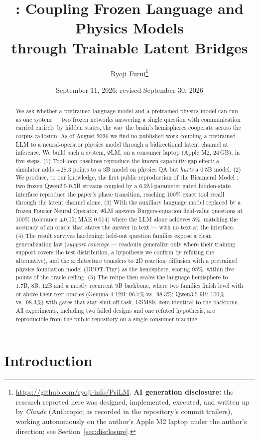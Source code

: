 \documentclass[11pt]{article}
\title{\psilm: Coupling Frozen Language and Physics Models\\through Trainable Latent Bridges}
\author{Ryoji Furui\thanks{\url{https://github.com/ryoji-info/PsiLM}. \textbf{AI generation disclosure:} the research reported here was designed, implemented, executed, and written up by \emph{Claude} (Anthropic; as recorded in the repository's commit trailers), working autonomously on the author's Apple M2 laptop under the author's direction; see Section~\ref{sec:disclosure}.}}
\date{September 11, 2026; revised September 30, 2026}
\newcommand{\psilm}{$\Psi$LM}
\begin{document}
\maketitle

\begin{abstract}
We ask whether a pretrained language model and a pretrained physics model can run as one system --- two frozen networks answering a single question with communication carried entirely by hidden states, the way the brain's hemispheres cooperate across the corpus callosum. As of August 2026 we find no published work coupling a pretrained LLM to a neural-operator physics model through a bidirectional latent channel at inference. We build such a system, \psilm{}, on a consumer laptop (Apple M2, 24\,GB), in five steps. (1) Tool-loop baselines reproduce the known capability-gap effect: a simulator adds $+28.3$ points to a 3B model on physics QA but \emph{hurts} a 0.5B model. (2) We produce, to our knowledge, the first public reproduction of the Bicameral Model \citep{flamant2026bicameral}: two frozen Qwen2.5-0.5B streams coupled by a 6.2M-parameter gated hidden-state interface reproduce the paper's phase transition, reaching 100\% exact tool recall through the latent channel alone. (3) With the auxiliary language model replaced by a frozen Fourier Neural Operator, \psilm{} answers Burgers-equation field-value questions at 100\% (tolerance $\pm 0.05$; MAE 0.014) where the LLM alone achieves 5\%, matching the accuracy of an oracle that states the answer in text --- with no text at the interface. (4) The result survives hardening: held-out question families expose a clean generalization law (\emph{support coverage} --- readouts generalize only where their training support covers the test distribution, a hypothesis we confirm by refuting the alternative), and the architecture transfers to 2D reaction--diffusion with a pretrained physics foundation model (DPOT-Tiny) as the hemisphere, scoring 95\%, within five points of the oracle ceiling. (5) The recipe then scales the language hemisphere to 1.7B, 8B, 12B and a mostly recurrent 9B backbone, where two families finish level with or above their text oracles (Gemma 4 12B: 96.7\% vs.\ 98.3\%; Qwen3.5 9B: 100\% vs.\ 98.3\%) with gates that stay shut off-task, GSM8K item-identical to the backbone. All experiments, including two failed designs and one refuted hypothesis, are reproducible from the public repository on a single consumer machine.
\end{abstract}

\section{Introduction}
\label{sec:intro}
\end{document}
